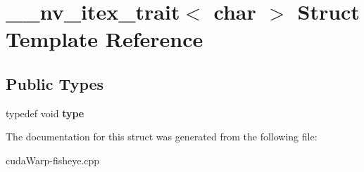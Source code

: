 \hypertarget{struct____nv__itex__trait_3_01char_01_4}{}\section{\+\_\+\+\_\+nv\+\_\+itex\+\_\+trait$<$ char $>$ Struct Template Reference}
\label{struct____nv__itex__trait_3_01char_01_4}
\subsection*{Public Types}
\begin{DoxyCompactItemize}
\item 
typedef void {\bfseries type}\hypertarget{struct____nv__itex__trait_3_01char_01_4_abcba79a503332fbdee0ac8937a81ea90}{}\label{struct____nv__itex__trait_3_01char_01_4_abcba79a503332fbdee0ac8937a81ea90}

\end{DoxyCompactItemize}


The documentation for this struct was generated from the following file\+:\begin{DoxyCompactItemize}
\item 
cuda\+Warp-\/fisheye.\+cpp\end{DoxyCompactItemize}
